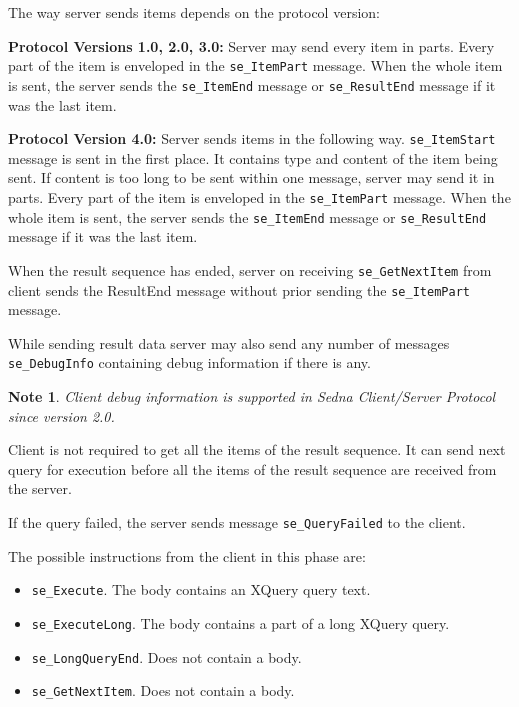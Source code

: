 \documentclass[a4paper,12pt]{article}
\newtheorem{note}{Note}    %
\newenvironment{citemize}
{\begin{itemize}
  \setlength{\itemsep}{0pt}
  \setlength{\parskip}{0pt}
  \setlength{\parsep}{0pt}}
{\end{itemize}}
\begin{document}
The way server sends items depends on the protocol version:

\textbf{Protocol Versions 1.0, 2.0, 3.0:} Server may send every item in parts.
Every part of the item is enveloped in the \verb!se_ItemPart! message. When the
whole item is sent, the server sends the \verb!se_ItemEnd! message or
\verb!se_ResultEnd! message if it was the last item.

\textbf{Protocol Version 4.0:} Server sends items in the following way.
\verb!se_ItemStart! message is sent in the first place. It contains type and
content of the item being sent. If content is too long to be sent within one
message, server may send it in parts. Every part of the item is enveloped in the
\verb!se_ItemPart! message. When the whole item is sent, the server sends the
\verb!se_ItemEnd! message or \verb!se_ResultEnd! message if it was the last
item.

When the result sequence has ended, server on receiving \verb!se_GetNextItem!
from client sends the ResultEnd message without prior sending the
\verb!se_ItemPart! message.

While sending result data server may also send any number of messages
\verb!se_DebugInfo! containing debug information if there is any.

\begin{note}
Client debug information is supported in Sedna Client/Server Protocol since
version 2.0.
\end{note}

Client is not required to get all the items of the result sequence. It can send
next query for execution before all the items of the result sequence are
received from the server.

If the query failed, the server sends message \verb!se_QueryFailed! to the client.

The possible instructions from the client in this phase are:
\begin{citemize}
\item \verb!se_Execute!. The body contains an XQuery query text.
\item \verb!se_ExecuteLong!. The body contains a part of a long XQuery query.
\item \verb!se_LongQueryEnd!. Does not contain a body.
\item \verb!se_GetNextItem!. Does not contain a body.
\end{citemize}
\end{document}
